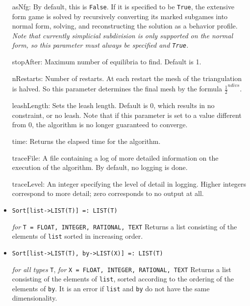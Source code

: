 \begin{itemize}
\bd
\item
[asNfg:] By default, this is \verb+False+.  If it is specified to be
\verb+True+, the extensive form game is solved by recursively converting
its marked subgames into normal form, solving, and reconstructing the
solution as a behavior profile.  {\it Note that currently simplicial
subdivision is only supported on the normal form, so this parameter
must always be specified and {\tt True}.}
\item
[stopAfter:] Maximum number of equilibria to find. Default is 1.  
\item 
[nRestarts:] Number of restarts.  At each restart the mesh of the
triangulation is halved.  So this parameter determines the final mesh
by the formula $\frac{1}{2}^{ndivs}$.
\item
[leashLength:] Sets the leash length. Default is 0, which results in no
constraint, or no leash.  Note that if this parameter is set to a value
different from 0, the algorithm is no longer guaranteed to converge.
\item
[time:] Returns the elapsed time for the algorithm.
\item
[traceFile:] A file containing a log of more detailed information on the
execution of the algorithm.  By default, no logging is done.
\item
[traceLevel:] An integer specifying the level of detail in logging.
Higher integers correspond to more detail; zero corresponds to
no output at all.
\ed
\ed

\item{}
\protect \large \begin{verbatim}
Sort[list->LIST(T)] =: LIST(T)
\end{verbatim} \normalsize

{\it for} {\tt T = FLOAT, INTEGER, RATIONAL, TEXT}
\bd
Returns a list consisting of the elements of \verb+list+ sorted in
increasing order.
\ed

\item{}
\protect \large \begin{verbatim}
Sort[list->LIST(T), by->LIST(X)] =: LIST(T)
\end{verbatim} \normalsize

{\it for all types} {\tt T}, {\it for} {\tt X = FLOAT, INTEGER, RATIONAL,
TEXT}
\bd
Returns a list consisting of the elements of \verb+list+, sorted
according to the ordering of the elements of \verb+by+.  It is an
error if \verb+list+ and \verb+by+ do not have the same dimensionality.
\ed


\end{itemize}
